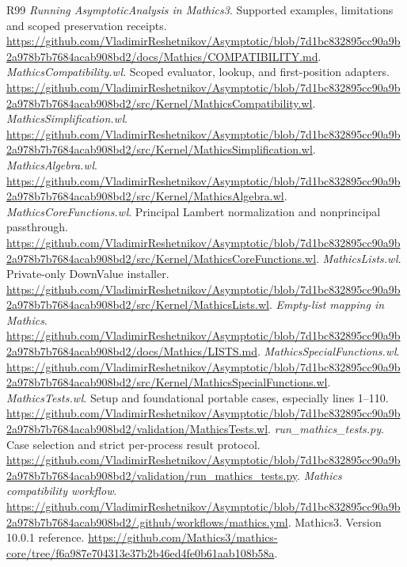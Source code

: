 \documentclass[11pt,letterpaper]{article}
\begin{document}
\begin{thebibliography}{R99}
 \emph{Running AsymptoticAnalysis in Mathics3}. Supported examples, limitations and scoped preservation receipts. \url{https://github.com/VladimirReshetnikov/Asymptotic/blob/7d1bc832895cc90a9b2a978b7b7684acab908bd2/docs/Mathics/COMPATIBILITY.md}.
 \emph{MathicsCompatibility.wl}. Scoped evaluator, lookup, and first-position adapters. \url{https://github.com/VladimirReshetnikov/Asymptotic/blob/7d1bc832895cc90a9b2a978b7b7684acab908bd2/src/Kernel/MathicsCompatibility.wl}.
 \emph{MathicsSimplification.wl}. \url{https://github.com/VladimirReshetnikov/Asymptotic/blob/7d1bc832895cc90a9b2a978b7b7684acab908bd2/src/Kernel/MathicsSimplification.wl}.
 \emph{MathicsAlgebra.wl}. \url{https://github.com/VladimirReshetnikov/Asymptotic/blob/7d1bc832895cc90a9b2a978b7b7684acab908bd2/src/Kernel/MathicsAlgebra.wl}.
 \emph{MathicsCoreFunctions.wl}. Principal Lambert normalization and nonprincipal passthrough. \url{https://github.com/VladimirReshetnikov/Asymptotic/blob/7d1bc832895cc90a9b2a978b7b7684acab908bd2/src/Kernel/MathicsCoreFunctions.wl}.
 \emph{MathicsLists.wl}. Private-only DownValue installer. \url{https://github.com/VladimirReshetnikov/Asymptotic/blob/7d1bc832895cc90a9b2a978b7b7684acab908bd2/src/Kernel/MathicsLists.wl}.
 \emph{Empty-list mapping in Mathics}. \url{https://github.com/VladimirReshetnikov/Asymptotic/blob/7d1bc832895cc90a9b2a978b7b7684acab908bd2/docs/Mathics/LISTS.md}.
 \emph{MathicsSpecialFunctions.wl}. \url{https://github.com/VladimirReshetnikov/Asymptotic/blob/7d1bc832895cc90a9b2a978b7b7684acab908bd2/src/Kernel/MathicsSpecialFunctions.wl}.
 \emph{MathicsTests.wl}. Setup and foundational portable cases, especially lines 1--110. \url{https://github.com/VladimirReshetnikov/Asymptotic/blob/7d1bc832895cc90a9b2a978b7b7684acab908bd2/validation/MathicsTests.wl}.
 \emph{run\_mathics\_tests.py}. Case selection and strict per-process result protocol. \url{https://github.com/VladimirReshetnikov/Asymptotic/blob/7d1bc832895cc90a9b2a978b7b7684acab908bd2/validation/run_mathics_tests.py}.
 \emph{Mathics compatibility workflow}. \url{https://github.com/VladimirReshetnikov/Asymptotic/blob/7d1bc832895cc90a9b2a978b7b7684acab908bd2/.github/workflows/mathics.yml}.
 Mathics3. Version 10.0.1 reference. \url{https://github.com/Mathics3/mathics-core/tree/f6a987e704313e37b2b46ed4fe0b61aab108b58a}.

\end{thebibliography}
\end{document}

